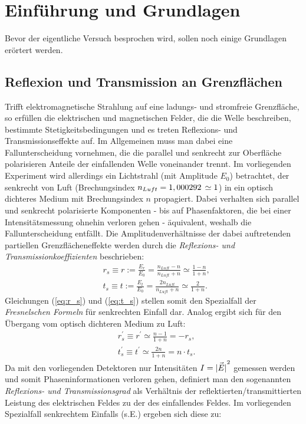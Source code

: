 \section{Einführung und Grundlagen}
	
	Bevor der eigentliche Versuch besprochen wird, sollen noch einige Grundlagen erörtert werden.
\subsection{Reflexion und Transmission an Grenzflächen} \label{sec:fresnel}
	Trifft elektromagnetische Strahlung auf eine ladungs- und stromfreie Grenzfläche, so erfüllen die elektrischen und magnetischen Felder, die die Welle beschreiben, bestimmte Stetigkeitsbedingungen und es treten Reflexions- und Transmissionseffekte auf. Im Allgemeinen muss man dabei eine Fallunterscheidung vornehmen, die die parallel und senkrecht zur Oberfläche polarisieren Anteile der einfallenden Welle voneinander trennt. Im vorliegenden Experiment wird allerdings ein Lichtstrahl (mit Amplitude $E_0$) betrachtet, der senkrecht von Luft (Brechungsindex $n_{Luft} = \unit[1,000292]{} \simeq 1$) in ein optisch dichteres Medium mit Brechungsindex $n$ propagiert. Dabei verhalten sich parallel und senkrecht polarisierte Komponenten - bis auf Phasenfaktoren, die bei einer Intensitätsmessung ohnehin verloren gehen - äquivalent, weshalb die Fallunterscheidung entfällt. Die Amplitudenverhältnisse der dabei auftretenden partiellen Grenzflächeneffekte werden durch die \textit{Reflexions- und Transmissionkoeffizienten} beschrieben:
	\begin{align}
		&r_s \equiv r := \frac{E_r}{E_0} = \frac{n_{Luft} - n}{n_{Luft} + n} \simeq \frac{1 - n}{1 + n}, \label{eq:r_s}\\
		&t_s \equiv t := \frac{E_t}{E_0} = \frac{2n_{Luft}}{n_{Luft} + n} \simeq \frac{2}{1 + n}. \label{eq:t_s} 
	\end{align}
	Gleichungen (\ref{eq:r_s}) und (\ref{eq:t_s}) stellen somit den Spezialfall der \textit{Fresnelschen Formeln} für senkrechten Einfall dar. Analog ergibt sich für den Übergang vom optisch dichteren Medium zu Luft:
	\begin{align}
			&r_s^\prime \equiv r^\prime \simeq \frac{n - 1}{1 + n} = -r_s,\\
			&t_s^\prime \equiv t^\prime \simeq \frac{2n}{1 + n} = n \cdot t_s. 
	\end{align}
	Da mit den vorliegenden Detektoren nur Intensitäten $I = \vec{\left\vert E\right\vert}^2$ gemessen werden und somit Phaseninformationen verloren gehen, definiert man den sogenannten \textit{Reflexions- und Transmissionsgrad} als Verhältnis der reflektierten/transmittierten Leistung des elektrischen Feldes zu der des einfallendes Feldes. Im vorliegenden Spe\-zial\-fall senkrechtem Einfalls (s.E.) ergeben sich diese zu:
